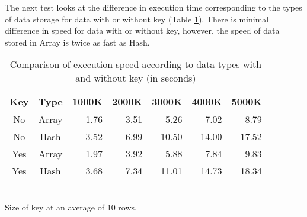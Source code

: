 The next test looks at the difference in execution time corresponding to the types of data storage for data with or without key (Table \ref{tb:bench2}). There is minimal difference in speed for data with or without key, however, the speed of data stored in Array is twice as fast as Hash.   

\begin{table}[htpb]
\begin{center}
\caption{Comparison of execution speed according to data types with and without key (in seconds) \label{tb:bench2}}
\begin{tabular}{c|c||r|r|r|r|r}
\hline
Key & Type     & 1000K & 2000K& 3000K & 4000K & 5000K\\ \hline\hline
No & Array  & 1.76  & 3.51 & 5.26  & 7.02  & 8.79 \\
No & Hash   & 3.52  & 6.99 & 10.50 & 14.00 & 17.52\\
Yes & Array  & 1.97  & 3.92 & 5.88  & 7.84  & 9.83 \\
Yes & Hash   & 3.68  & 7.34 & 11.01 & 14.73 & 18.34\\
\hline
\end{tabular}  
{\small
\\Size of key at an average of 10 rows. \\
}
\end{center}
\end{table}  

%

